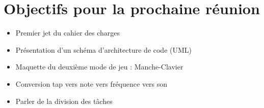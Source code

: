 \documentclass{scrartcl}
\begin{document}
\section{Objectifs pour la prochaine réunion}
\begin{itemize}
\item Premier jet du cahier des charges
\item Présentation d'un schéma d'architecture de code (UML)
\item Maquette du deuxième mode de jeu : Manche-Clavier
\item Conversion tap vers note vers fréquence vers son
\item Parler de la division des tâches
\end{itemize}
\end{document}
